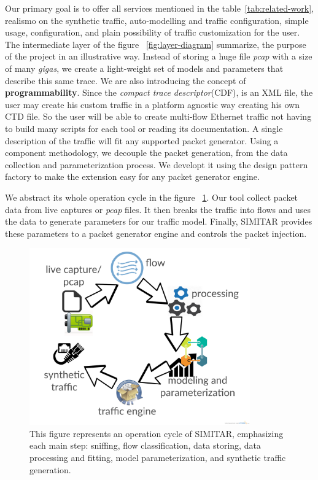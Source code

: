 Our primary goal is to offer all services mentioned in the table~\ref{tab:related-work}, realismo on the synthetic traffic, auto-modelling and traffic configuration, simple usage,  configuration, and plain possibility of traffic customization for the user. The intermediate layer of the figure ~\ref{fig:layer-diagram} summarize, the purpose of the project in an illustrative way. Instead of storing a huge file \textit{pcap} with a size of many \textit{gigas}, we create a light-weight set of models and parameters that describe this same trace. We are also introducing the concept of \textbf{programmability}. Since the \textit{compact trace descriptor}(CDF), is an XML file, the user may create his custom traffic in a platform agnostic way creating his own CTD file. So the user will be able to create multi-flow Ethernet traffic not having to build many scripts for each tool or reading its documentation. A single description of the traffic will fit any supported packet generator. Using a component methodology, we decouple the packet generation, from the data collection and parameterization process. We developt it using the design pattern factory to make the extension easy for any packet generator engine. 


We abstract its whole operation cycle in the figure ~\ref{fig:cycle-of-operation}. Our tool collect packet data  from live captures or \textit{pcap} files. It then breaks the traffic into flows and uses the data to generate  parameters for our traffic model. Finally, SIMITAR provides these parameters to a packet generator engine and controls the packet injection.

\begin{figure}[ht!]
        \centering
        \includegraphics[height=3.0in]{figures/ch3/digram-project-cycle}
        \caption{This figure represents an operation cycle of SIMITAR, emphasizing each main step: sniffing, flow classification, data storing, data processing and fitting, model parameterization,  and synthetic traffic generation.}
    \label{fig:cycle-of-operation}
\end{figure}



